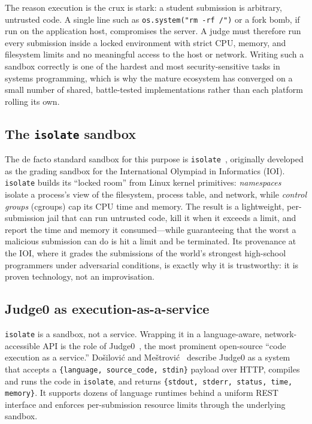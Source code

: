 The reason execution is the crux is stark: a student submission is arbitrary, untrusted
code. A single line such as \texttt{os.system("rm -rf /")} or a fork bomb, if run on the
application host, compromises the server. A judge must therefore run every submission inside
a locked environment with strict CPU, memory, and filesystem limits and no meaningful access
to the host or network. Writing such a sandbox correctly is one of the hardest and most
security-sensitive tasks in systems programming, which is why the mature ecosystem has
converged on a small number of shared, battle-tested implementations rather than each
platform rolling its own.

\subsection{The \texttt{isolate} sandbox}

The de facto standard sandbox for this purpose is
\texttt{isolate}~\cite{isolate}, originally developed as the grading sandbox for the
International Olympiad in Informatics (IOI). \texttt{isolate} builds its ``locked room''
from Linux kernel primitives: \emph{namespaces} isolate a process's view of the filesystem,
process table, and network, while \emph{control groups} (cgroups) cap its CPU time and
memory. The result is a lightweight, per-submission jail that can run untrusted code, kill
it when it exceeds a limit, and report the time and memory it consumed---while guaranteeing
that the worst a malicious submission can do is hit a limit and be terminated. Its
provenance at the IOI, where it grades the submissions of the world's strongest
high-school programmers under adversarial conditions, is exactly why it is trustworthy: it
is proven technology, not an improvisation.

\subsection{Judge0 as execution-as-a-service}

\texttt{isolate} is a sandbox, not a service. Wrapping it in a language-aware,
network-accessible API is the role of Judge0~\cite{judge0,dosilovic2018judge0}, the most
prominent open-source ``code execution as a service.'' Do\v{s}ilovi\'{c} and
Me\v{s}trovi\'{c}~\cite{dosilovic2018judge0} describe Judge0 as a system that accepts a
\texttt{\{language, source\_code, stdin\}} payload over HTTP, compiles and runs the code in
\texttt{isolate}, and returns \texttt{\{stdout, stderr, status, time, memory\}}. It supports
dozens of language runtimes behind a uniform REST interface and enforces per-submission
resource limits through the underlying sandbox.

